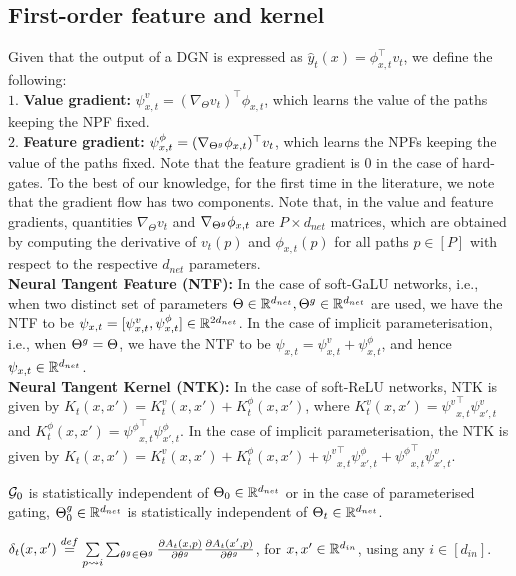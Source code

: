 \subsection{First-order feature and kernel}
Given that the output of a DGN is expressed as $\hat{y}_t(x)=\phi_{x,t}^\top v_t$, we define the following:\\
$1.$ \textbf{Value gradient:} $\psi_{x,t}^v=(\nabla_{\Theta}v_t)^\top  \phi_{x,t}$, which learns the value of the paths keeping the NPF fixed. \\
$2.$ \textbf{Feature gradient:}  $\psi_{x,t}^{\phi}=(\nabla_{{\Theta}^g}\phi_{x,t})^\top v_t $, which learns the NPFs keeping the value of the paths fixed. Note that the feature gradient is $0$ in the case of hard-gates.
To the best of our knowledge, for the first time in the literature, we note that the gradient flow has two components. Note that, in the value and feature gradients, quantities $\nabla_{\Theta}v_t$ and $\nabla_{{\Theta}^g}\phi_{x,t}$ are $P\times d_{net}$ matrices, which are obtained by computing the derivative of $v_t(p)$ and $\phi_{x,t}(p)$ for all paths $p\in[P]$ with respect to the respective $d_{net}$ parameters.\\
\textbf{Neural Tangent Feature (NTF):} In the case of soft-GaLU networks, i.e., when two distinct set of parameters $\Theta\in\mathbb{R}^{d_{net}}, {\Theta}^g\in\mathbb{R}^{d_{net}}$ are used, we have the NTF to be $\psi_{x,t}=[\psi^v_{x,t},\psi^{\phi}_{x,t}]\in \mathbb{R}^{2d_{net}}$. In the case of implicit parameterisation, i.e., when ${\Theta}^g=\Theta$, we have the NTF to be $\psi_{x,t}=\psi^v_{x,t}+\psi^{\phi}_{x,t}$, and hence $\psi_{x,t}\in\mathbb{R}^{d_{net}}$.\\
\textbf{Neural Tangent Kernel (NTK):} In the case of soft-ReLU networks, NTK is given by $K_t(x,x')=K^v_t(x,x')+K^{\phi}_t(x,x')$, where $K^v_t(x,x')={\psi^v}^\top_{x,t}\psi^v_{x',t}$ and $K^{\phi}_t(x,x')={\psi^{\phi}}^\top_{x,t}\psi^{\phi}_{x',t}$. In the case of implicit parameterisation, the NTK is given by $K_t(x,x')=K^v_t(x,x')+K^{\phi}_t(x,x')+{\psi^v}^\top_{x,t} \psi^{\phi}_{x',t} + {\psi^{\phi}}^\top_{x,t} \psi^{v}_{x',t}$.
\begin{assumption}\label{assmp:decouple}
$\mathcal{G}_0$ is statistically independent of $\Theta_0\in\mathbb{R}^{d_{net}}$ or in the case of parameterised gating, ${\Theta}^g_0\in\mathbb{R}^{d_{net}}$ is statistically independent of $\Theta_t\in\mathbb{R}^{d_{net}}$.
\end{assumption}
\begin{definition}\label{def:delta}
$\delta_t(x,x')\stackrel{def}= \underset{{p\rightsquigarrow i}}{\sum} \sum_{\theta^g\in{\Theta}^g}\frac{\partial A_{t}(x,p)}{\partial \theta^g} \frac{\partial A_{t}(x',p)}{\partial \theta^g}$, for $x,x'\in\mathbb{R}^{d_{in}}$, using any $i\in[d_{in}]$.
\end{definition}
